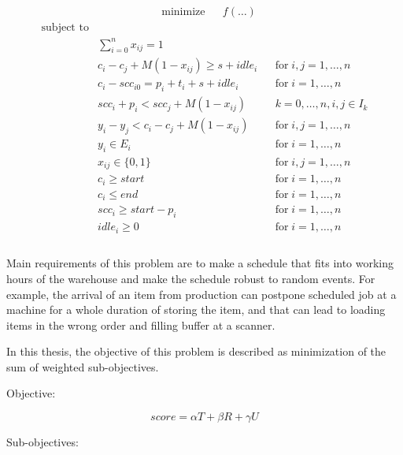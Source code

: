 \documentclass{ctuthesis}
\begin{document}
\begin{equation}
\begin{aligned}
&\text{minimize}
&&f(\ldots)
\end{aligned}
\end{equation}
\begin{equation}
\begin{aligned}
\text{subject to}\\
& \sum_{i=0}^{n} x_{ij} = 1 &&\\
& c_{i} - c_{j} + M(1 - x_{ij}) \geq s + idle_{i} && \text{for}\; i,j = 1, \ldots, n\\
& c_{i} - scc_{i0} = p_{i} + t_i + s + idle_i && \text{for}\; i = 1, \ldots, n\\
& scc_{i} + p_i < scc_j + M(1 - x_{ij}) && k = 0,\ldots,n, i,j \in I_k\\
& y_{i} - y_{j} < c_i - c_j + M(1 - x_{ij}) && \text{for}\; i,j = 1, \ldots, n\\
& y_i \in E_i && \text{for}\; i = 1, \ldots, n\\
& x_{ij} \in \{0, 1\}  && \text{for}\; i,j = 1, \ldots, n\\ 
& c_i \geq start && \text{for}\; i = 1, \ldots, n\\
& c_i \leq end && \text{for}\; i = 1, \ldots, n\\
& scc_{i} \geq start - p_i && \text{for}\; i = 1, \ldots, n\\
& idle_i \geq 0 && \text{for}\; i = 1, \ldots, n\\
\end{aligned}
\end{equation}
\\

Main requirements of this problem are to make a schedule that fits into working hours of the warehouse and make the schedule robust to random events. For example, the arrival of an item from production can postpone scheduled job at a machine for a whole duration of storing the item, and that can lead to loading items in the wrong order and filling buffer at a scanner. 

In this thesis, the objective of this problem is described as minimization of the sum of weighted sub-objectives.

Objective:

\begin{equation}
    score = \alpha T + \beta R + \gamma  U
\end{equation}

Sub-objectives:
\end{document}
